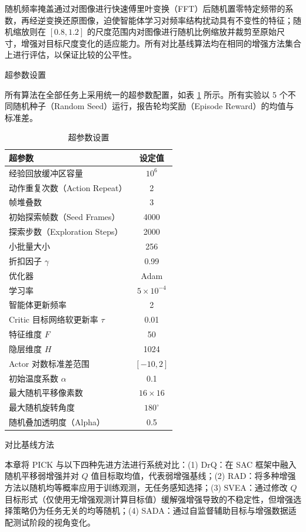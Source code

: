 随机频率掩盖通过对图像进行快速傅里叶变换（FFT）后随机置零特定频带的系数，再经逆变换还原图像，迫使智能体学习对频率结构扰动具有不变性的特征；随机缩放则在 $[0.8, 1.2]$ 的尺度范围内对图像进行随机比例缩放并裁剪至原始尺寸，增强对目标尺度变化的适应能力。所有对比基线算法均在相同的增强方法集合上进行评估，以保证比较的公平性。

超参数设置

所有算法在全部任务上采用统一的超参数配置，如表 \ref{tab:hyperparams} 所示。所有实验以 5 个不同随机种子（Random Seed）运行，报告轮均奖励（Episode Reward）的均值与标准差。

\begin{table}[htbp]
    \centering
    \caption{超参数设置}
    \label{tab:hyperparams}
    \begin{tabular}{lc}
        \hline
        超参数 & 设定值 \\
        \hline
        经验回放缓冲区容量 & $10^6$ \\
        动作重复次数（Action Repeat） & 2 \\
        帧堆叠数 & 3 \\
        初始探索帧数（Seed Frames） & 4000 \\
        探索步数（Exploration Steps） & 2000 \\
        小批量大小 & 256 \\
        折扣因子 $\gamma$ & 0.99 \\
        优化器 & Adam \\
        学习率 & $5 \times 10^{-4}$ \\
        智能体更新频率 & 2 \\
        Critic 目标网络软更新率 $\tau$ & 0.01 \\
        特征维度 $F$ & 50 \\
        隐层维度 $H$ & 1024 \\
        Actor 对数标准差范围 & $[-10, 2]$ \\
        初始温度系数 $\alpha$ & 0.1 \\
        最大随机平移像素数 & $16 \times 16$ \\
        最大随机旋转角度 & $180^\circ$ \\
        随机叠加透明度（Alpha） & 0.5 \\
        \hline
    \end{tabular}
\end{table}

对比基线方法

本章将 PICK 与以下四种先进方法进行系统对比：(1) DrQ\cite{kostrikov2020image}：在 SAC 框架中融入随机平移弱增强并对 $Q$ 值目标取均值，代表弱增强基线；(2) RAD\cite{laskin2020reinforcement}：将多种增强方法以随机均等概率应用于训练观测，无任务感知选择；(3) SVEA\cite{hansen2021stabilizing}：通过修改 $Q$ 目标形式（仅使用无增强观测计算目标值）缓解强增强导致的不稳定性，但增强选择策略仍为任务无关的均等随机；(4) SADA\cite{almuzairee2024recipe}：通过自监督辅助目标与增强数据适配测试阶段的视角变化。

